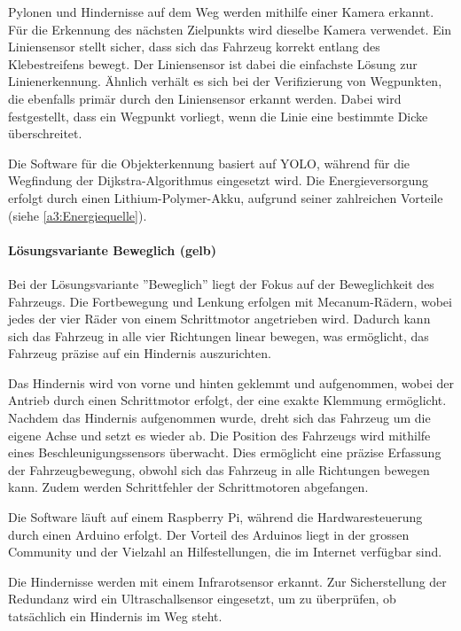 \documentclass[../main.tex]{subfiles}
\begin{document}
    Pylonen und Hindernisse auf dem Weg werden mithilfe einer Kamera erkannt. Für die Erkennung des nächsten Zielpunkts wird dieselbe Kamera verwendet. Ein Liniensensor stellt sicher, dass sich das Fahrzeug korrekt entlang des Klebestreifens bewegt. Der Liniensensor ist dabei die einfachste Lösung zur Linienerkennung. Ähnlich verhält es sich bei der Verifizierung von Wegpunkten, die ebenfalls primär durch den Liniensensor erkannt werden. Dabei wird festgestellt, dass ein Wegpunkt vorliegt, wenn die Linie eine bestimmte Dicke überschreitet. 

    Die Software für die Objekterkennung basiert auf YOLO, während für die Wegfindung der Dijkstra-Algorithmus eingesetzt wird. Die Energieversorgung erfolgt durch einen Lithium-Polymer-Akku, aufgrund seiner zahlreichen Vorteile (siehe \ref{a3:Energiequelle}).
    
    \newpage
    
    \paragraph{Lösungsvariante Beweglich (gelb)}
    \label{a3:loesungsvariante_beweglich}
    Bei der Lösungsvariante ''Beweglich'' liegt der Fokus auf der Beweglichkeit des Fahrzeugs. Die Fortbewegung und Lenkung erfolgen mit Mecanum-Rädern, wobei jedes der vier Räder von einem Schrittmotor angetrieben wird. Dadurch kann sich das Fahrzeug in alle vier Richtungen linear bewegen, was ermöglicht, das Fahrzeug präzise auf ein Hindernis auszurichten.

    Das Hindernis wird von vorne und hinten geklemmt und aufgenommen, wobei der Antrieb durch einen Schrittmotor erfolgt, der eine exakte Klemmung ermöglicht. Nachdem das Hindernis aufgenommen wurde, dreht sich das Fahrzeug um die eigene Achse und setzt es wieder ab. Die Position des Fahrzeugs wird mithilfe eines Beschleunigungssensors überwacht. Dies ermöglicht eine präzise Erfassung der Fahrzeugbewegung, obwohl sich das Fahrzeug in alle Richtungen bewegen kann. Zudem werden Schrittfehler der Schrittmotoren abgefangen.

    Die Software läuft auf einem Raspberry Pi, während die Hardwaresteuerung durch einen Arduino erfolgt. Der Vorteil des Arduinos liegt in der grossen Community und der Vielzahl an Hilfestellungen, die im Internet verfügbar sind.

    Die Hindernisse werden mit einem Infrarotsensor erkannt. Zur Sicherstellung der Redundanz wird ein Ultraschallsensor eingesetzt, um zu überprüfen, ob tatsächlich ein Hindernis im Weg steht.
\end{document}
